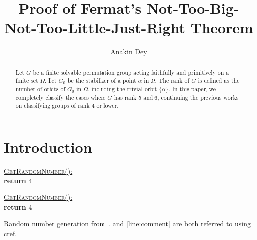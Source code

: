 \documentclass[letterpaper]{amsart}
\title{Proof of Fermat's Not-Too-Big-Not-Too-Little-Just-Right Theorem}
\author{Anakin Dey}
\begin{document}
\begin{abstract}
    Let $G$ be a finite solvable permutation group acting faithfully and primitively on a finite set $\Omega$. 
    Let $G_0$ be the stabilizer of a point $\alpha$ in $\Omega$.
    The rank of $G$ is defined as the number of orbits of $G_0$ in $\Omega$, including the trivial orbit $\{\alpha\}$. 
    In this paper, we completely classify the cases where $G$ has rank 5 and 6, continuing the previous works on classifying groups of rank 4 or lower.
\end{abstract}

\maketitle

\section{Introduction}\label{sec: intro}

\begin{algo}[1.3]
    \underline{\textsc{GetRandomNumber}():}\+
\\      \textbf{return} $4$   
\\      \hspace{39.00pt}
\end{algo}

\begin{nalgo}
                    \underline{\textsc{GetRandomNumber}():}\+
\\\label{line:ret}      \textbf{return} $4$   
\\\label{line:comment}  \hspace{39.00pt}
\end{nalgo}

Random number generation from~\cite{site:xkcd}.  and \cref{line:comment} are both referred to using cref.

\end{document}
